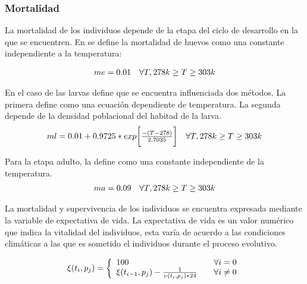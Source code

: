 \subsubsection{Mortalidad}
La mortalidad de los individuos depende de la etapa del ciclo de desarrollo en la que se encuentren. En 
\cite{otero2006stochastic} se define la mortalidad de huevos como una constante independiente a la temperatura:

\begin{equation}
 \begin{array}{l l}
    me = 0.01 & \forall T,  278 k \geq T \geq 303 k
\end{array}
\end{equation}

En el caso de las larvas \cite{otero2006stochastic} define que se encuentra influenciada dos métodos. La primera
define como una ecuación dependiente de temperatura. La segunda depende de la densidad poblacional del habitad de la
larva.
\begin{equation}
 \begin{array}{l l}
 ml = 0.01 + 0.9725 * exp\bigg[ \frac{-(T - 278)}{2.7035}\bigg] & \forall T, 278 k \geq T \geq 303 k
\end{array}
\end{equation}

Para la etapa adulto, \cite{otero2006stochastic} la define como una constante independiente de la temperatura.
\begin{equation}
 \begin{array}{l l}
    ma = 0.09 & \forall T, 278 k \geq T \geq 303 k
\end{array}
\end{equation}

La mortalidad y supervivencia de los individuos se encuentra expresada mediante la variable de expectativa de
vida. La expectativa de vida es un valor numérico que indica la vitalidad del individuos, esta varía de acuerdo
a las condiciones climáticas a las que es sometido el individuos durante el proceso evolutivo.

\begin{equation}
\xi (t_{i}, p_{j}) = \left\{
  \begin{array}{l l}
    100 & \quad \forall i = 0 \\
    \xi (t_{i-1}, p_{j}) - \frac{1}{\upsilon(t_{i}, p_{j}) * 24} & \quad \forall i \neq 0
  \end{array} \right.
\end{equation}

